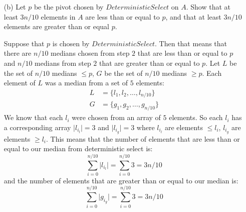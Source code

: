 \documentclass{article}
\begin{document}
\begin{itemize}
    \item [(b)] Let $p$ be the pivot chosen by $DeterministicSelect$ on $A$. Show that at least $3n/10$ elements in $A$ are less than or equal to $p$, and that at least $3n/10$ elements are greater than or equal $p$.
        \begin{answer}
            Suppose that $p$ is chosen by $DeterministicSelect$. Then that means that there are $n / 10$ medians chosen from step $2$ that are less than or equal to $p$ and $n / 10$ medians from step $2$ that are greater than or equal to $p$. Let $L$ be the set of $n / 10$ medians $\leq p$, $G$ be the set of $n / 10$ medians $\geq p$. Each element of $L$ was a median from a set of $5$ elements:
                \begin{align*}
                    L &= \{l_{1}, l_{2}, \ldots, l_{n / 10}\} \\
                    G &= \{g_{1}, g_{2}, \ldots, g_{n / 10}\}   
                \end{align*}
            We know that each $l_{i}$ were chosen from an array of $5$ elements. So each $l_{i}$ has a corresponding array $\lvert l_{i_{l}} \rvert = 3$ and $\lvert l_{i_{g}} \rvert = 3$ where $l_{i_{l}}$ are elements $\leq l_{i}$, $l_{i_{g}}$ are elements $\geq l_{i}$. This means that the number of elements that are less than or equal to our median from deterministic select is:
                \begin{equation*}
                    \sum_{i = 0}^{n / 10} \lvert l_{i_{l}} \rvert = \sum_{i = 0}^{n / 10} 3 = 3n / 10
                \end{equation*}
            and the number of elements that are greater than or equal to our median is:
                \begin{equation*}
                    \sum_{i = 0}^{n / 10} \lvert g_{i_{g}} \rvert = \sum_{i = 0}^{n / 10} 3 = 3n / 10
                \end{equation*}
        \end{answer}


\end{itemize}
\end{document}
